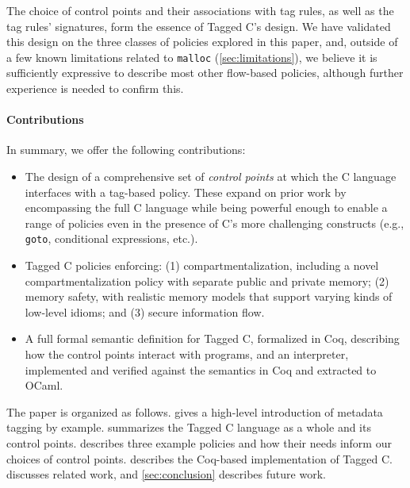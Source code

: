\documentclass{llncs}
\begin{document}
The choice of control points and their associations with tag rules, as well as the tag rules'
signatures, form the essence of Tagged C's design. 
We have validated this design on the three classes of policies explored in this paper,
and, outside of a few known limitations related to {\tt malloc} (\cref{sec:limitations}), %
we believe it is sufficiently expressive to describe most other flow-based policies, although 
further experience is needed to confirm this.

\paragraph*{Contributions}

In summary, we offer the following contributions:

\begin{itemize}
\item The design of a comprehensive set of {\em control points} at which the C language interfaces
  with a tag-based policy. These expand on prior work by encompassing the full C language
  while being powerful enough to enable a range of policies even in the presence of C's more challenging
  constructs (e.g., {\tt goto}, conditional expressions, etc.).
\item Tagged C policies enforcing: (1) compartmentalization, including a novel compartmentalization policy
  with separate public and private memory; (2) memory safety, with realistic memory models that support
  varying kinds of low-level idioms; and (3) secure information flow.
\item A full formal semantic definition for Tagged C, formalized in Coq, describing how the
  control points interact with programs, and an interpreter, implemented and verified against
  the semantics in Coq and extracted to OCaml.
\end{itemize}

The paper is organized as follows.
 gives a high-level introduction of metadata tagging by example.
 summarizes the Tagged C language as a whole and its control points.
 describes three example policies and how their
needs inform our choices of control points. 
 describes the Coq-based implementation of Tagged C.
 discusses related work, and \cref{sec:conclusion}
describes future work.
\end{document}
